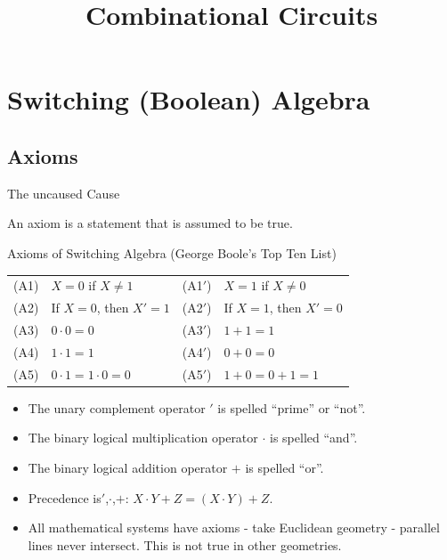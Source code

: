 \title{Combinational Circuits}

\section{Switching (Boolean) Algebra}
\subsection{Axioms}

\begin{frame}{The uncaused Cause}
  \begin{definition}
    An \alert{axiom} is a statement that is assumed to be true.
  \end{definition}
  \begin{block}{Axioms of Switching Algebra (George Boole's Top Ten List)}
    \begin{center}
      \begin{tabular}{llll}
        (A1) & $X=0$ if $X \neq 1$ & (A1$'$) & $X=1$ if $X \neq 0$ \\
        (A2) & If $X=0$, then $X'=1$ & (A2$'$) & If $X=1$, then $X'=0$ \\
        (A3) & $0 \cdot 0 = 0$ & (A3$'$) & $1 + 1 = 1$ \\
        (A4) & $1 \cdot 1 = 1$ & (A4$'$) & $0 + 0 = 0$ \\
        (A5) & $0 \cdot 1 = 1 \cdot 0 = 0$ & (A5$'$) & $1 + 0 = 0 + 1 = 1$ \\
      \end{tabular}
    \end{center}
  \end{block}
  \begin{itemize}
    \item The unary \alert{complement} operator $'$ is spelled ``prime'' or ``not''.
    \item The binary \alert{logical multiplication} operator $\cdot$ is spelled ``and''.
    \item The binary \alert{logical addition} operator $+$ is spelled ``or''.
    \item Precedence is$'$,$\cdot$,$+$: $X \cdot Y + Z = (X \cdot Y) + Z$.
  \end{itemize}
\end{frame}

\begin{itemize}
  \item All mathematical systems have axioms - take Euclidean geometry - parallel lines never intersect.  This is not true in other geometries.
\end{itemize}

